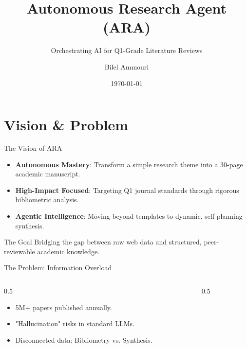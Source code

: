 \documentclass[10pt]{beamer}
\title{Autonomous Research Agent (ARA)}
\subtitle{Orchestrating AI for Q1-Grade Literature Reviews}
\author{Bilel Ammouri}
\institute{Advanced Agentic Coding -- Research Division}
\date{\today}
\begin{document}
\begin{frame}
    \titlepage
\end{frame}


\section{Vision \& Problem}
\begin{frame}{The Vision of ARA}
    \begin{itemize}
        \item \textbf{Autonomous Mastery}: Transform a simple research theme into a 30-page academic manuscript.
        \item \textbf{High-Impact Focused}: Targeting Q1 journal standards through rigorous bibliometric analysis.
        \item \textbf{Agentic Intelligence}: Moving beyond templates to dynamic, self-planning synthesis.
    \end{itemize}
    \vfill
    \begin{exampleblock}{The Goal}
        Bridging the gap between raw web data and structured, peer-reviewable academic knowledge.
    \end{exampleblock}
\end{frame}

\begin{frame}{The Problem: Information Overload}
    \begin{columns}
        \begin{column}{0.5\textwidth}
            \begin{itemize}
                \item 5M+ papers published annually.
                \item "Hallucination" risks in standard LLMs.
                \item Disconnected data: Bibliometry vs. Synthesis.
            \end{itemize}
        \end{column}
        \begin{column}{0.5\textwidth}
        \end{column}
    \end{columns}
\end{frame}
\end{document}
